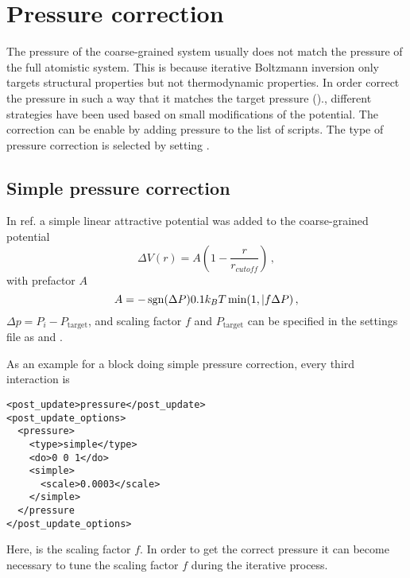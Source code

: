 
\section{Pressure correction}

The pressure of the coarse-grained system usually does not match the pressure of the full atomistic system. This is because iterative Boltzmann inversion only targets structural properties but not thermodynamic properties. In order correct the pressure in such a way that it matches the target pressure ()., different strategies have been used based on small modifications of the potential. The correction can be enable by adding pressure to the list of  scripts. The type of pressure correction is selected by setting .

\subsection{Simple pressure correction}
In ref.\cite{Reith:2003} a simple linear attractive potential was added to the coarse-grained potential
\begin{equation}
  \Delta V(r)=A \left( 1-\frac{r}{r_{cutoff}} \right) \,,
\end{equation}
with prefactor $A$
\begin{equation}
  A = -\operatorname{sgn}(\Delta P)0.1k_{B}T\min(1,|f\Delta P) \,,
\end{equation}
$\Delta p=P_i-P_\text{target}$, and scaling factor $f$ and $P_\text{target}$ can be specified in the settings file as  and .

As an example for a block doing simple pressure correction, every third interaction is
\begin{lstlisting}
<post_update>pressure</post_update>
<post_update_options>
  <pressure>
    <type>simple</type>
    <do>0 0 1</do>
    <simple>
      <scale>0.0003</scale>
    </simple>
  </pressure
</post_update_options>
\end{lstlisting}
Here,  is the scaling factor $f$. In order to get the correct pressure it can become necessary to tune the scaling factor $f$ during the iterative process.

